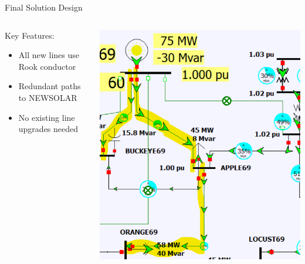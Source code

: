 \documentclass{beamer}
\begin{document}
\begin{frame}{Final Solution Design}
\begin{columns}[T]
\begin{column}{0.5\textwidth}
			\vspace{1em}
			\begin{minipage}{\columnwidth}
				Key Features:
				\begin{itemize}
					\item All new lines use Rook conductor
					\item Redundant paths to NEWSOLAR
					\item No existing line upgrades needed
				\end{itemize}
			\end{minipage}
		\end{column}
		\begin{column}{0.5\textwidth}
			\includegraphics[width=\linewidth]{figures/case1_plusnewline}
		\end{column}
	\end{columns}
\end{frame}
	
\end{document}
